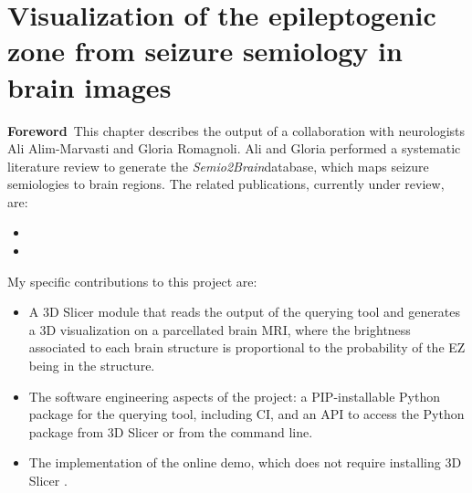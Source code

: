 \chapter[Visualization of the epileptogenic zone in brain images]{Visualization of the epileptogenic zone from seizure semiology in brain images}

\label{chap:svt}

\newcommand{\svtdatabase}{\textit{Semio2Brain}}

\minitoc

\begin{center}
  \begin{minipage}[b]{0.9\linewidth}
    \small
    \textbf{Foreword\,}
    This chapter describes the output of a collaboration with neurologists Ali Alim-Marvasti and Gloria Romagnoli.
    Ali and Gloria performed a systematic literature review to generate the \svtdatabase database, which maps seizure semiologies to brain regions.
    The related publications, currently under review, are:
    \begin{itemize}
      \item {}
      \item {}
    \end{itemize}

    My specific contributions to this project are:
    \begin{itemize}
      \item A 3D Slicer module \cite{fedorov_3d_2012} that reads the output of the querying tool and generates a 3D visualization on a parcellated brain \ac{MRI}, where the brightness associated to each brain structure is proportional to the probability of the \ac{EZ} being in the structure.
      \item The software engineering aspects of the project: a \ac{PIP}-installable Python package for the querying tool, including \ac{CI}, and an \ac{API} to access the Python package from 3D Slicer or from the command line.
      \item The implementation of the online demo, which does not require installing 3D Slicer%
      .
    \end{itemize}

  \end{minipage}
\end{center}

\acresetall
\doublespacing






\onehalfspacing %
